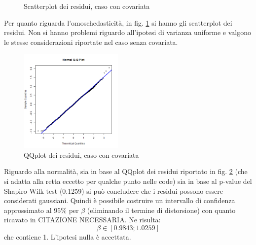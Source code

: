 \documentclass[a4paper,11pt,twoside,openright]{book}							%
\begin{document}
\begin{figure}[t]
	\centering
	\caption{Scatterplot dei residui, caso con covariata}
	\label{fig:DomCcovar_residui}
\end{figure}

Per quanto riguarda l'omoschedasticità, in fig. \ref{fig:DomCcovar_residui} si hanno gli scatterplot dei residui. Non si hanno problemi riguardo all'ipotesi di varianza uniforme e valgono le stesse considerazioni riportate nel caso senza covariata.

\begin{figure}[h]
	\centering
	\includegraphics[width=0.45\textwidth]{Immagini/DomCCovar/QQplot.png}   
   \caption{QQplot dei residui, caso con covariata}
	\label{fig:DomCcovar_qqplot}
\end{figure}
Riguardo alla normalità, sia in base al QQplot dei residui riportato in fig. \ref{fig:DomCcovar_qqplot} (che si adatta alla retta eccetto per qualche punto nelle code) sia in base al p-value del Shapiro-Wilk test (0.1259) si può concludere che i residui possono essere considerati gaussiani. Quindi è possibile costruire un intervallo di confidenza approssimato al $95\%$ per $\beta$ (eliminando il termine di distorsione) con quanto ricavato in CITAZIONE NECESSARIA. Ne risulta:
$$
\beta \in [0.9843;1.0259]
$$
che contiene 1. L'ipotesi nulla è accettata.
\end{document}
